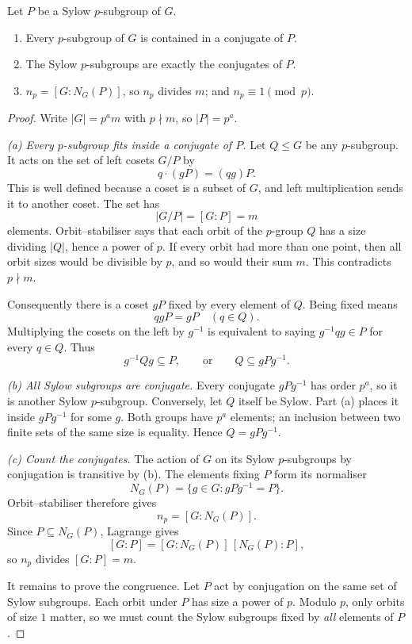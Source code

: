 \begin{theorem}\label{thm:sylow23}
Let $P$ be a Sylow $p$-subgroup of $G$.
\begin{enumerate}[label=(\alph*)]
\item Every $p$-subgroup of $G$ is contained in a conjugate of $P$.
\item The Sylow $p$-subgroups are exactly the conjugates of $P$.
\item $n_p=[G:N_G(P)]$, so $n_p$ divides $m$; and $n_p\equiv1\pmod p$.
\end{enumerate}
\end{theorem}
\begin{proof}
Write $|G|=p^a m$ with $p\nmid m$, so $|P|=p^a$.

\emph{(a) Every $p$-subgroup fits inside a conjugate of $P$.}
Let $Q\le G$ be any $p$-subgroup. It acts on the set of left cosets $G/P$ by
\[
q\cdot(gP)=(qg)P.
\]
This is well defined because a coset is a subset of $G$, and left multiplication sends it to another coset. The set has
\[
|G/P|=[G:P]=m
\]
elements. Orbit--stabiliser says that each orbit of the $p$-group $Q$ has a size dividing $|Q|$, hence a power of $p$. If every orbit had more than one point, then all orbit sizes would be divisible by $p$, and so would their sum $m$. This contradicts $p\nmid m$.

Consequently there is a coset $gP$ fixed by every element of $Q$. Being fixed means
\[
qgP=gP\quad(q\in Q).
\]
Multiplying the cosets on the left by $g^{-1}$ is equivalent to saying $g^{-1}qg\in P$ for every $q\in Q$. Thus
\[
g^{-1}Qg\subseteq P,\qquad\text{or}\qquad Q\subseteq gPg^{-1}.
\]

\emph{(b) All Sylow subgroups are conjugate.}
Every conjugate $gPg^{-1}$ has order $p^a$, so it is another Sylow $p$-subgroup. Conversely, let $Q$ itself be Sylow. Part (a) places it inside $gPg^{-1}$ for some $g$. Both groups have $p^a$ elements; an inclusion between two finite sets of the same size is equality. Hence $Q=gPg^{-1}$.

\emph{(c) Count the conjugates.}
The action of $G$ on its Sylow $p$-subgroups by conjugation is transitive by (b). The elements fixing $P$ form its normaliser
\[
N_G(P)=\{g\in G:gPg^{-1}=P\}.
\]
Orbit--stabiliser therefore gives
\[
n_p=[G:N_G(P)].
\]
Since $P\subseteq N_G(P)$, Lagrange gives
\[
[G:P]=[G:N_G(P)]\,[N_G(P):P],
\]
so $n_p$ divides $[G:P]=m$.

It remains to prove the congruence. Let $P$ act by conjugation on the same set of Sylow subgroups. Each orbit under $P$ has size a power of $p$. Modulo $p$, only orbits of size $1$ matter, so we must count the Sylow subgroups fixed by \emph{all} elements of $P$.


\end{proof}
